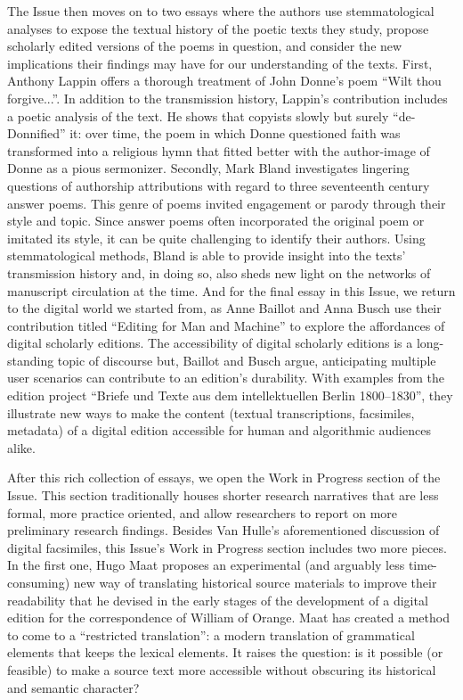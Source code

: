 \begin{preface}
The Issue then moves on to two essays where the authors use stemmatological analyses to expose the textual history of the poetic texts they study, propose scholarly edited versions of the poems in question, and consider the new implications their findings may have for our understanding of the texts. 
First, Anthony Lappin offers a thorough treatment of John Donne's poem ``Wilt thou forgive...''. In addition to the transmission history, Lappin's contribution includes a poetic analysis of the text. 
He shows that copyists slowly but surely ``de-Donnified'' it: over time, the poem in which Donne questioned faith was transformed into a religious hymn that fitted better with the author-image of Donne as  a pious sermonizer. 
Secondly, Mark Bland investigates lingering questions of authorship attributions with regard to three seventeenth century answer poems. 
This genre of poems invited engagement or parody through their style and topic. 
Since answer poems often incorporated the original poem or imitated its style, it can be quite challenging to identify their authors. Using stemmatological methods, Bland is able to provide insight into the texts' transmission history and, in doing so, also sheds new light on the networks of manuscript circulation at the time.
And for the final essay in this Issue, we return to the digital world we started from, as Anne Baillot and Anna Busch use their contribution titled ``Editing for Man and Machine'' to explore the affordances of digital scholarly editions. The accessibility of digital scholarly editions is a long-standing topic of discourse but, Baillot and Busch argue, anticipating multiple user scenarios can contribute to an edition's durability. With examples from the edition project ``Briefe und Texte aus dem intellektuellen Berlin 1800–1830'', they illustrate new ways to make the content (textual transcriptions, facsimiles, metadata) of a digital edition accessible for human and algorithmic audiences alike.

After this rich collection of essays, we open the Work in Progress section of the Issue. This section traditionally houses shorter research narratives that are less formal, more practice oriented, and allow researchers to report on more preliminary research findings. 
Besides Van Hulle's aforementioned discussion of digital facsimiles, this Issue's Work in Progress section includes two more pieces. 
In the first one, Hugo Maat proposes an experimental (and arguably less time-consuming) new way of translating historical source materials to improve their readability that he devised in the early stages of the development of a digital edition for the correspondence of William of Orange. 
Maat has created a method to come to a ``restricted translation'': a modern translation of grammatical elements that keeps the lexical elements. 
It raises the question: is it possible (or feasible) to make a source text more accessible without obscuring its historical and semantic character?


\end{preface}
